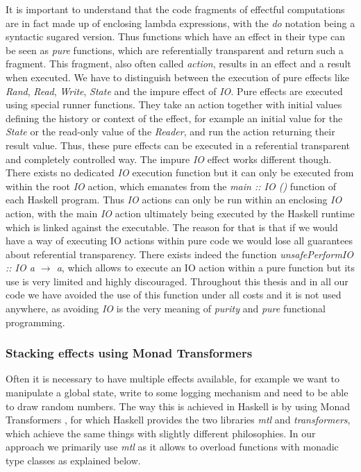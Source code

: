 It is important to understand that the code fragments of effectful computations are in fact  made up of enclosing lambda expressions, with the \textit{do} notation being a syntactic sugared version. Thus functions which have an effect in their type can be seen as \textit{pure} functions, which are referentially transparent and return such a fragment. This fragment, also often called \textit{action}, results in an effect and a result when executed. We have to distinguish between the execution of pure effects like \textit{Rand}, \textit{Read}, \textit{Write}, \textit{State} and the impure effect of \textit{IO}. Pure effects are executed using special runner functions. They take an action together with initial values defining the history or context of the effect, for example an initial value for the \textit{State} or the read-only value of the \textit{Reader}, and run the action returning their result value. Thus, these pure effects can be executed in a referential transparent and completely controlled way. The impure \textit{IO} effect works different though. There exists no dedicated \textit{IO} execution function but it can only be executed from within the root \textit{IO} action, which emanates from the \textit{main :: IO ()} function of each Haskell program. Thus \textit{IO} actions can only be run within an enclosing \textit{IO} action, with the main \textit{IO} action ultimately being executed by the Haskell runtime which is linked against the executable. The reason for that is that if we would have a way of executing IO actions within pure code we would lose all guarantees about referential transparency. There exists indeed the function \textit{unsafePerformIO :: IO a $\rightarrow$ a}, which allows to execute an IO action within a pure function but its use is very limited and highly discouraged. Throughout this thesis and in all our code we have avoided the use of this function under all costs and it is not used anywhere, as avoiding \textit{IO} is the very meaning of \textit{purity} and \textit{pure} functional programming.

\subsubsection{Stacking effects using Monad Transformers}
Often it is necessary to have multiple effects available, for example we want to manipulate a global state, write to some logging mechanism and need to be able to draw random numbers. The way this is achieved in Haskell is by using Monad Transformers \cite{jones_functional_1995}, for which Haskell provides the two libraries \textit{mtl} and \textit{transformers}, which achieve the same things with slightly different philosophies. In our approach we primarily use \textit{mtl} as it allows to overload functions with monadic type classes as explained below.

